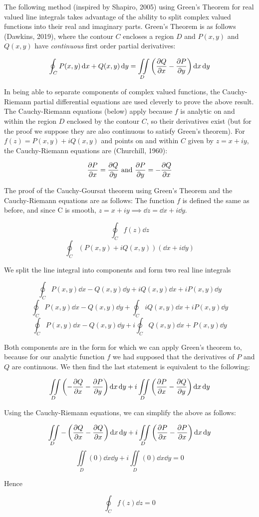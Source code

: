 \documentclass[11pt]{article}
\begin{document}
The following method (inspired by Shapiro, 2005) using Green's Theorem for real valued line integrals takes advantage of the ability to split complex valued functions into their real and imaginary parts. Green's Theorem is as follows (Dawkins, 2019), where the contour $C$ encloses a region $D$ and $P(x,y)$ and $Q(x,y)$ have \textit{continuous} first order partial derivatives:

$$\oint_C P(x,y)\dd{x} + Q(x,y)\dd{y} = \iint\limits_D\left( \pdv{Q}{x} - \pdv{P}{y}\right)\dd{x}\dd{y}$$

In being able to separate components of complex valued functions, the Cauchy-Riemann partial differential equations are used cleverly to prove the above result. The Cauchy-Riemann equations (below) apply because $f$ is analytic on and within the region $D$ enclosed by the contour $C$, so their derivatives exist (but for the proof we suppose they are also continuous to satisfy Green's theorem). For $f(z) = P(x,y) + iQ(x,y)$ and points on and within $C$ given by $z = x + iy$, the Cauchy-Riemann equations are (Churchill, 1960):

$$\pdv{P}{x} = \pdv{Q}{y} \text{  and  } \pdv{P}{y} = -\pdv{Q}{x}$$

The proof of the Cauchy-Goursat theorem using Green's Theorem and the Cauchy-Riemann equations are as follows: The function $f$ is defined the same as before, and since C is smooth, $z = x+iy \implies \dd{z} = \dd{x}+ i\dd{y}$.

$$\oint_C f(z)\dd{z}$$
$$\oint_C (P(x,y)+iQ(x,y))(\dd{x}+ i\dd{y})$$
\centerline{We split the line integral into components and form two real line integrals}
$$\oint_C P(x,y)\dd{x} - Q(x,y)\dd{y} + iQ(x,y)\dd{x} + iP(x,y)\dd{y}$$
$$\oint_C P(x,y)\dd{x} - Q(x,y)\dd{y} +\oint_C  iQ(x,y)\dd{x} + iP(x,y)\dd{y}$$
$$\oint_C P(x,y)\dd{x} - Q(x,y)\dd{y} +i\oint_C  Q(x,y)\dd{x} +P(x,y)\dd{y}$$

Both components are in the form for which we can apply Green's theorem to, because for our analytic function $f$ we had supposed that the derivatives of $P$ and $Q$ are continuous. We then find the last statement is equivalent to the following:

$$\iint\limits_D\left(- \pdv{Q}{x} - \pdv{P}{y}\right)\dd{x}\dd{y} + i\iint\limits_D\left( \pdv{P}{x} - \pdv{Q}{y}\right)\dd{x}\dd{y}$$

Using the Cauchy-Riemann equations, we can simplify the above as follows:

$$\iint\limits_D -\left( \pdv{Q}{x} - \pdv{Q}{x}\right)\dd{x}\dd{y} + i\iint\limits_D\left( \pdv{P}{x} - \pdv{P}{x}\right)\dd{x}\dd{y}$$
$$\iint\limits_D (0)\dd{x}\dd{y} + i\iint\limits_D(0)\dd{x}\dd{y} = 0$$
\centerline{Hence}
$$\oint_C f(z)\dd{z} = 0$$
\end{document}
